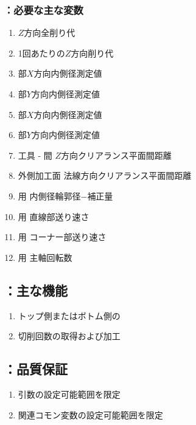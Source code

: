 \subsubsection{\KEndFaceRight：必要な主な変数}
\begin{enumerate}[label*=\sarrow]
\item \EndFacecutMilling$Z$方向全削り代
\item \EndFacecutMilling1回あたりの$Z$方向削り代
\item \TopEndFace 部$X$方向内側径測定値
\item \TopEndFace 部$Y$方向内側径測定値
\item \BottomEndFace 部$X$方向内側径測定値
\item \BottomEndFace 部$Y$方向内側径測定値
\item 工具 - \EndFace 間 $Z$方向クリアランス平面間距離
\item 外側加工面 法線方向クリアランス平面間距離
\item \EndFacecutMilling 用 内側径輪郭径$-$補正量
\item \EndFacecutMilling 用 直線部送り速さ
\item \EndFacecutMilling 用 コーナー部送り速さ
\item \EndFacecutMilling 用 主軸回転数
\end{enumerate}


\subsection{\KEndFaceRight：主な機能}
\begin{enumerate}[label*=\sarrow]
\item トップ側またはボトム側の\EndFacecutMilling
\item 切削回数の取得および加工
\end{enumerate}


\subsection{\KEndFaceRight：品質保証}
\begin{enumerate}[label*=\sarrow]
\item {}引数の設定可能範囲を限定
\item 関連コモン変数の設定可能範囲を限定
\end{enumerate}
